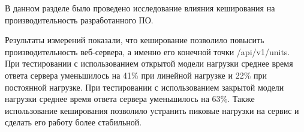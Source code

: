 

В данном разделе было проведено исследование влияния кеширования на производительность разработанного ПО.

Результаты измерений показали, что кеширование позволило повысить производительность веб-сервера, а именно его конечной точки /api/v1/units. При тестировании с использованием открытой модели нагрузки среднее время ответа сервера уменьшилось на 41\% при линейной нагрузке и 22\% при постоянной нагрузке. При тестировании с использованием закрытой модели нагрузки среднее время ответа сервера уменьшилось на 63\%. Также использование кеширования позволило устранить пиковые нагрузки на сервис и сделать его работу более стабильной.



\pagebreak